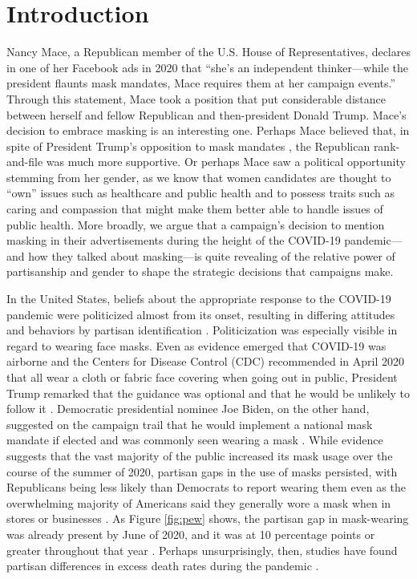 
\section{Introduction}

Nancy Mace, a Republican member of the U.S. House of Representatives, declares in one of her Facebook ads in 2020 that ``she's an independent thinker---while the president flaunts mask mandates, Mace requires them at her campaign events.'' Through this statement, Mace took a position that put considerable distance between herself and fellow Republican and then-president Donald Trump. Mace's decision to embrace masking is an interesting one. Perhaps Mace believed that, in spite of President Trump's opposition to mask mandates \parencite{robertson2020}, the Republican rank-and-file was much more supportive. Or perhaps Mace saw a political opportunity stemming from her gender, as we know that women candidates are thought to ``own'' issues such as healthcare and public health \parencite{shapiro1986gender} and to possess traits such as caring and compassion \parencite{huddy1993gender} that might make them better able to handle issues of public health. More broadly, we argue that a campaign's decision to mention masking in their advertisements during the height of the COVID-19 pandemic---and how they talked about masking---is quite revealing of the relative power of partisanship and gender to shape the strategic decisions that campaigns make.

In the United States, beliefs about the appropriate response to the COVID-19 pandemic were politicized almost from its onset, resulting in differing attitudes and behaviors by partisan identification \parencite{gollust_emergence_2020,gadarian_partisanship_2021,mordecai_public_nodate}. Politicization was especially visible in regard to wearing face masks. Even as evidence emerged that COVID-19 was airborne and the Centers for Disease Control (CDC) recommended in April 2020 that all wear a cloth or fabric face covering when going out in public, President Trump remarked that the guidance was optional and that he would be unlikely to follow it \parencite{liptak2020}. Democratic presidential nominee Joe Biden, on the other hand, suggested on the campaign trail that he would implement a national mask mandate if elected and was commonly seen wearing a mask \parencite{stolberg2020}. While evidence suggests that the vast majority of the public increased its mask usage over the course of the summer of 2020, partisan gaps in the use of masks persisted, with Republicans being less likely than Democrats to report wearing them even as the overwhelming majority of Americans said they generally wore a mask when in stores or businesses \parencite{kramer_more_2020}. As Figure \ref{fig:pew} shows, the partisan gap in mask-wearing was already present by June of 2020, and it was at 10 percentage points or greater throughout that year \parencite{gramlich2022}. Perhaps unsurprisingly, then, studies have found partisan differences in excess death rates during the pandemic \parencite{wallace2022excess}.

